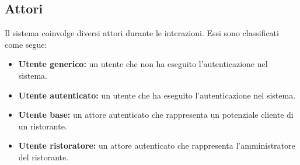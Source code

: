 \subsection{Attori}
Il sistema coinvolge diversi attori durante le interazioni. 
Essi sono classificati come segue:
\begin{itemize}
	\item \textbf{Utente generico:} un utente che non ha eseguito l'autenticazione nel sistema.
	\item \textbf{Utente autenticato:} un utente che ha eseguito l'autenticazione nel sistema.
	\item \textbf{Utente base:}  un attore autenticato che rappresenta un potenziale cliente di un ristorante.
	\item \textbf{Utente ristoratore:} un attore autenticato che rappresenta l'amministratore del ristorante.
\end{itemize}
